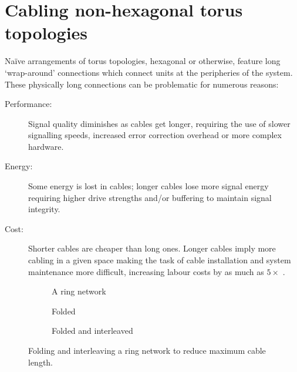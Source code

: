 	\section{Cabling non-hexagonal torus topologies}
		
		Na\"ive arrangements of torus topologies, hexagonal or otherwise, feature
		long `wrap-around' connections which connect units at the peripheries of
		the system. These physically long connections can be problematic for
		numerous reasons:
		
		\begin{description}
			
			\item[Performance:] Signal quality diminishes as cables get longer,
			requiring the use of slower signalling speeds, increased error
			correction overhead or more complex hardware.
			
			\item[Energy:] Some energy is lost in cables; longer cables lose more
			signal energy requiring higher drive strengths and/or buffering to
			maintain signal integrity.
			
			\item[Cost:] Shorter cables are cheaper than long ones.  Longer cables
			imply more cabling in a given space making the task of cable installation
			and system maintenance more difficult, increasing labour costs by as much
			as $5\times$ \cite{curtis12}.
			
		\end{description}
		
		\begin{figure}
			\center
			\begin{subfigure}[b]{0.39\linewidth}
				\center
				\caption{A ring network}
				\label{fig:ring-folding-row}
			\end{subfigure}
			\begin{subfigure}[b]{0.24\linewidth}
				\center
				\caption{Folded}
				\label{fig:ring-folding-folded}
			\end{subfigure}
			\begin{subfigure}[b]{0.35\linewidth}
				\center
				\caption{Folded and interleaved}
				\label{fig:ring-folding-interleaved}
			\end{subfigure}
			
			\caption[Folding and interleaving a ring network]%
			{Folding and interleaving a ring network to reduce maximum cable
			length.}
			\label{fig:ring-folding}
		\end{figure}
		
